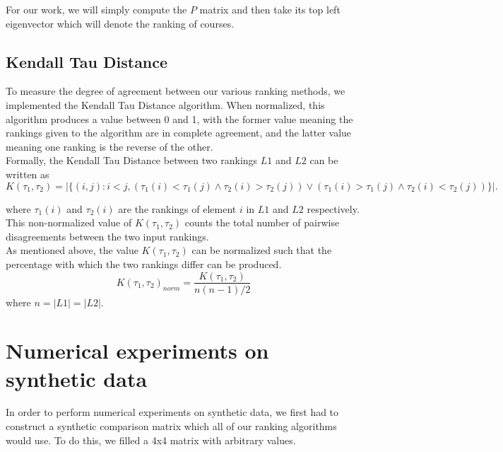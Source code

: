 \documentclass[10pt]{siamltex}
\begin{document}
\begin{pagewiselinenumbers}
For our work, we will simply compute the $P$ matrix and then take its top left eigenvector which will denote the ranking of courses.

\subsection{Kendall Tau Distance}
To measure the degree of agreement between our various ranking methods, we implemented the Kendall Tau Distance algorithm. When normalized, this algorithm produces a value between 0 and 1, with the former value meaning the rankings given to the algorithm are in complete agreement, and the latter value meaning one ranking is the reverse of the other.\\

Formally, the Kendall Tau Distance between two rankings $L1$ and $L2$ can be written as
\begin{equation}
K(\tau_1,\tau_2) = |\{(i,j): i < j, ( \tau_1(i) < \tau_1(j) \wedge \tau_2(i) > \tau_2(j) ) \vee ( \tau_1(i) > \tau_1(j) \wedge \tau_2(i) < \tau_2(j) )\}|.
\end{equation}

where $\tau_1(i)$ and $\tau_2(i)$ are the rankings of element $i$ in $L1$ and $L2$ respectively. This non-normalized value of $K(\tau_1,\tau_2)$ counts the total number of pairwise disagreements between the two input rankings.\\

As mentioned above, the value $K(\tau_1,\tau_2)$ can be normalized such that the percentage with which the two rankings differ can be produced.
\begin{equation}
K(\tau_1,\tau_2)_{norm} = \frac{K(\tau_1,\tau_2)}{n(n-1)/2}
\end{equation}
where $n = |L1| = |L2|$.

\section{Numerical experiments on synthetic data}  \label{sec:NumExpSyn}
In order to perform numerical experiments on synthetic data, we first had to construct a synthetic comparison matrix which all of our ranking algorithms would use. To do this, we filled a 4x4 matrix with arbitrary values.\\


\end{pagewiselinenumbers}
\end{document}
